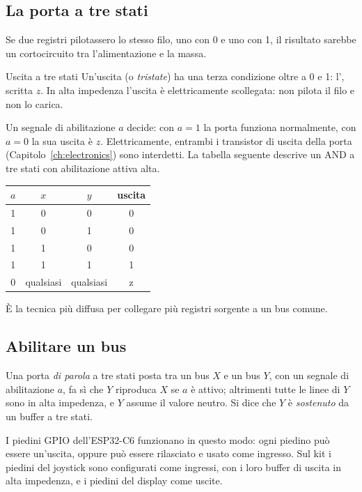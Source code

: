 \subsection{La porta a tre stati}

Se due registri pilotassero lo stesso filo, uno con 0 e uno con 1, il risultato
sarebbe un cortocircuito tra l'alimentazione e la massa.

\begin{definition}{Uscita a tre stati}
Un'uscita  (o \emph{tristate}) ha una terza condizione oltre
a 0 e 1: l', scritta $z$. In alta impedenza l'uscita è
elettricamente scollegata: non pilota il filo e non lo carica.
\end{definition}

Un segnale di abilitazione $a$ decide: con $a=1$ la porta funziona normalmente,
con $a=0$ la sua uscita è $z$. Elettricamente, entrambi i transistor di uscita
della porta (Capitolo~\ref{ch:electronics}) sono interdetti. La tabella
seguente descrive un AND a tre stati con abilitazione attiva alta.

\begin{center}\small\ttfamily
\begin{tabular}{ccc|c}
\textrm{$a$}&\textrm{$x$}&\textrm{$y$}&\textrm{uscita}\\\hline
1&0&0&0\\1&0&1&0\\1&1&0&0\\1&1&1&1\\\rowcolor{prgamber!15}0&\textrm{qualsiasi}&\textrm{qualsiasi}&z
\end{tabular}
\end{center}

È la tecnica più diffusa per collegare più registri sorgente a un bus comune.

\subsection{Abilitare un bus}

Una porta \emph{di parola} a tre stati posta tra un bus $X$ e un bus $Y$, con
un segnale di abilitazione $a$, fa sì che $Y$ riproduca $X$ se $a$ è attivo;
altrimenti tutte le linee di $Y$ sono in alta impedenza, e $Y$ assume il valore
neutro. Si dice che $Y$ è \emph{sostenuto} da un buffer a tre stati.

\begin{prgmachine}
I piedini GPIO dell'ESP32-C6 funzionano in questo modo: ogni piedino può essere
un'uscita, oppure può essere rilasciato e usato come ingresso. Sul kit i
piedini del joystick sono configurati come ingressi, con i loro buffer di
uscita in alta impedenza, e i piedini del display come uscite.
\end{prgmachine}

